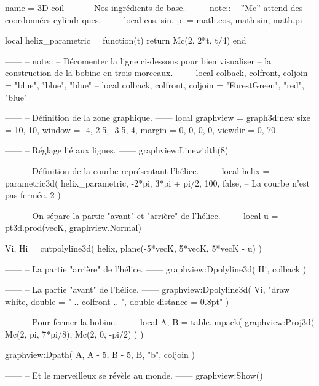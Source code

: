 \documentclass[varwidth, border = 3pt]{standalone}
\begin{document}
\begin{luadraw}{name = 3D-coil}
------
-- Nos ingrédients de base.
--
--
-- note::
--     ''Mc'' attend des coordonnées cylindriques.
------
local cos, sin, pi = math.cos, math.sin, math.pi

local helix_parametric = function(t)
  return Mc(2, 2*t, t/4)
end

------
-- note::
--     Décomenter la ligne ci-dessous pour bien visualiser
--     la construction de la bobine en trois morceaux.
------
local colback, colfront, coljoin = "blue", "blue", "blue"
-- local colback, colfront, coljoin = "ForestGreen", "red", "blue"

------
-- Définition de la zone graphique.
------
local graphview = graph3d:new{
  size    = {10, 10},
  window  = {-4, 2.5, -3.5, 4},
  margin  = {0, 0, 0, 0},
  viewdir = {0, 70}
}

------
-- Réglage lié aux lignes.
------
graphview:Linewidth(8)

------
-- Définition de la courbe représentant l'hélice.
------
local helix = parametric3d(
  helix_parametric,
  -2*pi, 3*pi + pi/2, 100,
  false,  -- La courbe n'est pas fermée.
  2
)

------
-- On sépare la partie "avant" et "arrière" de l'hélice.
------
local u = pt3d.prod(vecK, graphview.Normal)

Vi, Hi = cutpolyline3d(
  helix,
  plane(-5*vecK, 5*vecK, 5*vecK - u)
)

------
-- La partie "arrière" de l'hélice.
------
graphview:Dpolyline3d(
  Hi,
  colback
)

------
-- La partie "avant" de l'hélice.
------
graphview:Dpolyline3d(
  Vi,
     "draw = white, double = "
  .. colfront
  .. ", double distance = 0.8pt"
)

------
-- Pour fermer la bobine.
------
local A, B = table.unpack(
  graphview:Proj3d({
    Mc(2, pi, 7*pi/8),
    Mc(2, 0, -pi/2)
  })
)

graphview:Dpath(
  {A, A - 5, B - 5, B, "b"},
  coljoin
)

------
-- Et le merveilleux se révèle au monde.
------
graphview:Show()
\end{luadraw}
\end{document}
